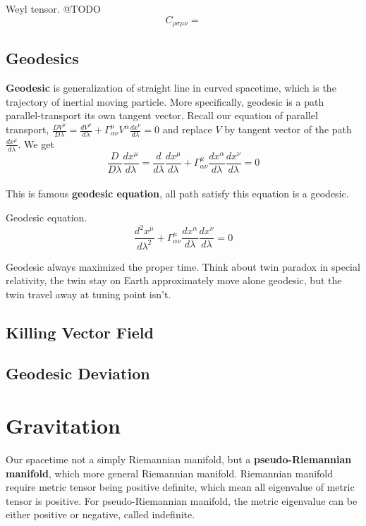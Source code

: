 \documentclass[12pt]{article}
\theoremstyle{mystyle}{\newtheorem{definition}{Definition}[section]}
\theoremstyle{mystyle}{\newtheorem{theorem}[definition]{Theorem}}
\theoremstyle{mystyle}{\newtheorem*{remark}{Remark}}
\theoremstyle{mystyle}{\newtheorem*{example}{Example}}
\theoremstyle{mystyle}{\newtheorem*{examples}{Examples}}
\theoremstyle{cstyle}{\newtheorem*{cthm}{}}
\begin{document}
\begin{definition}
  Weyl tensor. @TODO
  \[C_{\rho\sigma\mu\nu} = \]
\end{definition}
\subsection{Geodesics}

\textbf{Geodesic} is generalization of straight line in curved spacetime, which is the trajectory of inertial moving particle. 
More specifically, geodesic is a path parallel-transport its own tangent vector. 
Recall our equation of parallel transport, \(\frac{DV^{\mu}}{D\lambda} =
\frac{dV^{\mu}}{d\lambda}+ \Gamma^{\mu}_{\alpha\nu}V^{\alpha}\frac{dx^{\nu}}{d\lambda} = 0\) and replace \(V\) 
by tangent vector of the path \(\frac{dx^{\mu}}{d\lambda}\). We get 
\[\frac{D}{D\lambda}\frac{dx^{\mu}}{d\lambda} =
\frac{d}{d\lambda}\frac{dx^{\mu}}{d\lambda}+ \Gamma^{\mu}_{\alpha\nu}\frac{dx^{\alpha}}{d\lambda}\frac{dx^{\nu}}{d\lambda} = 0\]\\
This is famous \textbf{geodesic equation}, all path satisfy this equation is a geodesic.

\begin{definition}
  Geodesic equation.
  \[\frac{d^2 x^{\mu}}{d\lambda^2}+ \Gamma^{\mu}_{\alpha\nu}\frac{dx^{\alpha}}{d\lambda}\frac{dx^{\nu}}{d\lambda} = 0\]
\end{definition}

Geodesic always maximized the proper time. Think about twin paradox in special relativity, the twin stay on Earth approximately move alone geodesic, 
but the twin travel away at tuning point isn't.

\subsection{Killing Vector Field}

\subsection{Geodesic Deviation}

\section{Gravitation}

Our spacetime not a simply Riemannian manifold, but a \textbf{pseudo-Riemannian manifold}, which more general Riemannian manifold.
Riemannian manifold require metric tensor being positive definite, which mean all eigenvalue of metric tensor is positive.
For pseudo-Riemannian manifold, the metric eigenvalue can be either positive or negative, called indefinite.
\end{document}
